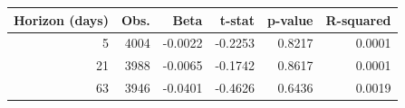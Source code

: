 \begin{tabular}{rrrrrr}
\toprule
Horizon (days) & Obs. & Beta & t-stat & p-value & R-squared \\
\midrule
5 & 4004 & -0.0022 & -0.2253 & 0.8217 & 0.0001 \\
21 & 3988 & -0.0065 & -0.1742 & 0.8617 & 0.0001 \\
63 & 3946 & -0.0401 & -0.4626 & 0.6436 & 0.0019 \\
\bottomrule
\end{tabular}
